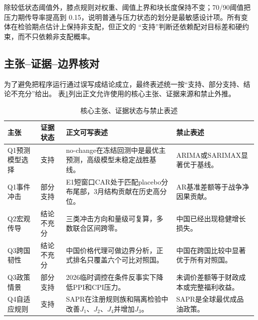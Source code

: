除较低状态阈值外，膝点规则对权重、阈值上界和块长度保持不变；70/90阈值把压力期传导率提高到
0.15，说明普通与压力状态的划分是最敏感设计项。所有变体在检验期点估计上保持非支配，但正文的
“支持”判断还依赖配对目标差和硬约束，而不只依赖非支配概率。

\subsection{主张--证据--边界核对}

为了避免把程序运行通过误写成结论成立，最终表述统一按“支持、部分支持、结论不充分”给出。
表\ref{tab:claim-boundary}列出正文允许使用的核心主张、证据来源和禁止外推。

\begin{table}[htbp]
  \centering
  \small
  \caption{核心主张、证据状态与禁止表述}
  \label{tab:claim-boundary}
  \begin{tabularx}{0.98\textwidth}{p{}p{}Xp{}}
    \toprule
    主张 & 证据状态 & 正文可写表述 & 禁止表述 \\
    \midrule
    Q1预测模型选择 & 支持 & no-change在冻结回测中是最优主预测，高级模型未稳定战胜基线。 & ARIMA或SARIMAX显著优于基线。 \\
    Q1事件冲击 & 部分支持 & E1短窗口CAR处于匹配placebo分布尾部，3月结构贡献在历史高分位。 & AR基准差额等于战争净因果贡献。 \\
    Q2宏观传导 & 结论不充分 & 三类冲击方向和量级可复算，多数联合区间跨零。 & 中国已经出现稳健增长损失。 \\
    Q3跨国韧性 & 结论不充分 & 中国价格代理可做边界分析，正式排名只覆盖六个可比对照国。 & 中国在跨国比较中显著优于所有对照国。 \\
    Q3政策情景 & 部分支持 & 2026临时调控在条件反事实下降低PPI和CPI压力。 & 未调价差额等于财政成本或完整福利收益。 \\
    Q4自适应规则 & 支持 & SAPR在注册规则族和隔离检验中改善$J_1$、$J_2$、$J_4$并增加$J_3$。 & SAPR是全球最优成品油政策。 \\
    \bottomrule
  \end{tabularx}
\end{table}
